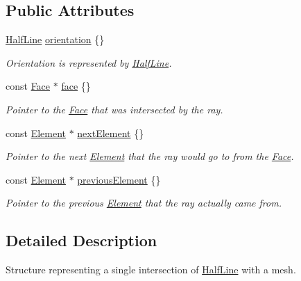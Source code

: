 \subsection*{Public Attributes}
\begin{DoxyCompactItemize}
\item 
\hyperlink{structraytracer_1_1geometry_1_1HalfLine}{Half\+Line} \hyperlink{structraytracer_1_1geometry_1_1Intersection_ac899194bf216a03b025f61b1981c8ce7}{orientation} \{\}
\begin{DoxyCompactList}\small\item\em Orientation is represented by \hyperlink{structraytracer_1_1geometry_1_1HalfLine}{Half\+Line}. \end{DoxyCompactList}\item 
const \hyperlink{classraytracer_1_1geometry_1_1Face}{Face} $\ast$ \hyperlink{structraytracer_1_1geometry_1_1Intersection_a993ca640c2f62bead2d29ebd2d605dc4}{face} \{\}
\begin{DoxyCompactList}\small\item\em Pointer to the \hyperlink{classraytracer_1_1geometry_1_1Face}{Face} that was intersected by the ray. \end{DoxyCompactList}\item 
const \hyperlink{classraytracer_1_1geometry_1_1Element}{Element} $\ast$ \hyperlink{structraytracer_1_1geometry_1_1Intersection_a141dc9291977b52dc561e1dff86694d9}{next\+Element} \{\}
\begin{DoxyCompactList}\small\item\em Pointer to the next \hyperlink{classraytracer_1_1geometry_1_1Element}{Element} that the ray would go to from the \hyperlink{classraytracer_1_1geometry_1_1Face}{Face}. \end{DoxyCompactList}\item 
const \hyperlink{classraytracer_1_1geometry_1_1Element}{Element} $\ast$ \hyperlink{structraytracer_1_1geometry_1_1Intersection_a22c5bb7b48818d87ff42cd426d5ac910}{previous\+Element} \{\}
\begin{DoxyCompactList}\small\item\em Pointer to the previous \hyperlink{classraytracer_1_1geometry_1_1Element}{Element} that the ray actually came from. \end{DoxyCompactList}\end{DoxyCompactItemize}


\subsection{Detailed Description}
Structure representing a single intersection of \hyperlink{structraytracer_1_1geometry_1_1HalfLine}{Half\+Line} with a mesh. 

